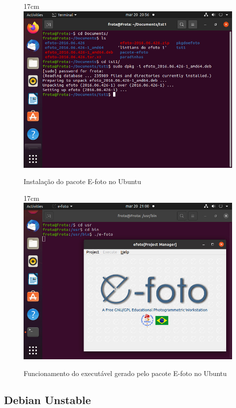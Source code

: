 \begin{figure}[!ht]{17cm}
	\centering
	\includegraphics[width=15cm]{Figuras/ubuntu_insta.jpg}
	\caption{Instalação do pacote E-foto no Ubuntu} \label{fig:ubuntu_insta}
\end{figure}

\begin{figure}[!ht]{17cm}
	\centering
	\includegraphics[width=15cm]{Figuras/ubuntu_exec.jpg}
	\caption{Funcionamento do executável gerado pelo pacote E-foto no Ubuntu} \label{fig:ubuntu_exec}
\end{figure}


\subsection{Debian Unstable}

